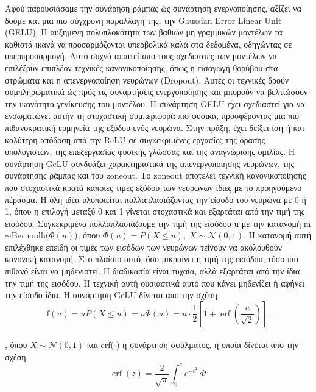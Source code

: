 \documentclass[12pt]{article}
\numberwithin{equation}{section}
\begin{document}
Αφού παρουσιάσαμε την συνάρηση ράμπας ώς συνάρτηση ενεργοποίησης, αξίζει να δούμε και μια πιο σύγχρονη παραλλαγή της, την Gaussian Error Linear Unit (GELU). Η αυξημένη πολυπλοκότητα των βαθιών μη γραμμικών μοντέλων τα καθιστά ικανά να προσαρμόζονται υπερβολικά καλά στα δεδομένα, οδηγώντας σε υπερπροσαρμογή. Αυτό συχνά απαιτεί απο τους σχεδιαστές των μοντέλων να επιλέξουν επιπλέον τεχνικές κανονικοποίησης, όπως η εισαγωγή θορύβου στα στρώματα και η απενεργοποίηση νευρώνων (Dropout). Αυτές οι τεχνικές δρούν συμπληρωματικά ώς πρός τις συναρτήσεις ενεργοποίησης και μπορούν να βελτιώσουν την ικανότητα γενίκευσης του μοντέλου. Η συνάρτηση GELU έχει σχεδιαστεί για να ενσωματώνει αυτήν τη στοχαστική συμπεριφορά πιο φυσικά, προσφέροντας μια πιο πιθανοκρατική ερμηνεία της εξόδου ενός νευρώνα. Στην πράξη, έχει δείξει ίση ή και καλύτερη απόδοση από την ReLU σε συγκεκριμένες εργασίες της όρασης υπολογιστών, της επεξεργασίας φυσικής γλώσσας και της αναγνώρισης ομιλίας. Η συνάρτηση GeLU συνδυάζει χαρακτηριστικά της απενεργοποίησης νευρώνων, της συνάρτησης ράμπας και του zoneout. Το zoneout αποτελεί τεχνική κανονικοποίησης που στοχαστικά κρατά κάποιες τιμές εξόδου των νευρώνων ίδιες με το προηγούμενο πέρασμα. Η όλη ιδέα υλοποιείται πολλαπλασιάζοντας την είσοδο του νευρώνα με 0 ή 1, όπου η επιλογή μεταξύ 0 και 1 γίνεται στοχαστικά και εξαρτάται από την τιμή της εισόδου. Συγκεκριμένα πολλαπλασιάζουμε την τιμή της εισόδου u με την κατανομή m \(\sim \mathrm{Bernoulli}\bigl(\Phi(u)\bigr)\), όπου \(\Phi(u) = P(X \leq u), \; X \sim \mathcal{N}(0, 1)\). Η κατανομή αυτή επιλέχθηκε επειδή οι τιμές των εισόδων των νευρώνων τείνουν να ακολουθούν κανονική κατανομή. Στο πλαίσιο αυτό, όσο μικραίνει η τιμή της εισόδου, τόσο πιο πιθανό είναι να μηδενιστεί. Η διαδικασία είναι τυχαία, αλλά εξαρτάται από την ίδια την τιμή της εισόδου. Η τεχνική αυτή ουσιαστικά αυτό που κάνει μηδενίζει ή αφήνει την είσοδο ίδια. Η συνάρτηση GeLU δίνεται απο την σχέση \\

\begin{equation}
\mathrm{f}(u) = u P(X \leq u) = u \Phi(u) = u \cdot \frac{1}{2} \left[1 + \operatorname{erf}\left(\frac{u}{\sqrt{2}}\right)\right].
\end{equation}\\

\noindent, όπου \(X \sim \mathcal{N}(0, 1)\) και erf(\(\cdot\)) η συνάρτηση σφάλματος, η οποία δίνεται απο την σχέση\\

\begin{equation}
\operatorname{erf}(z) = \frac{2}{\sqrt{\pi}} \int_{0}^{z} e^{-t^2} \, dt
\end{equation}\\
\end{document}
